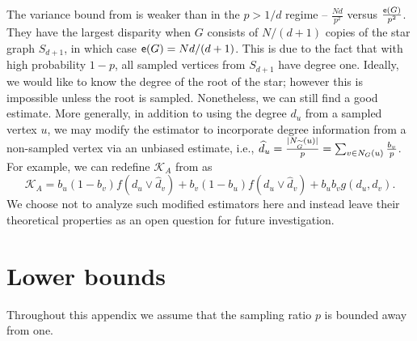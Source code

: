 \begin{remark}
The variance bound from  is weaker than  in the $ p > 1/d $ regime -- $ \frac{Nd}{p^2} $ versus $ \frac{{\mathsf{e}}(G)}{p^2} $. They have the largest disparity when $ G $ consists of $ N/(d+1) $ copies of the star graph $ S_{d+1} $, in which case $ {\mathsf{e}}(G) = Nd/(d+1) $. This is due to the fact that with high probability $ 1-p $, all sampled vertices from $ S_{d+1} $ have degree one. Ideally, we would like to know the degree of the root of the star; however this is impossible unless the root is sampled. Nonetheless, we can still find a good estimate. More generally, in addition to using the degree $ d_u $ from a sampled vertex $ u $, we may modify the estimator to incorporate degree information from a non-sampled vertex via an unbiased estimate, i.e., $ \widehat{d}_u = \frac{|N_{{\widetilde{G}}}(u)|}{p} = \sum_{v\in N_G(u)} \frac{b_v}{p} $. For example, we can redefine $ \mathcal{K}_{A} $ from  as
\begin{equation*}
\mathcal{K}_{A} = b_{u}(1-b_{v})f(d_u \vee \widehat{d}_v) + b_{v}(1-b_{u})f(d_u \vee \widehat{d}_v) + b_{u}b_{v}g(d_{u}, d_{v}).
\end{equation*}
We choose not to analyze such modified estimators here and instead leave their theoretical properties as an open question for future investigation.
\end{remark}


\section{Lower bounds} \label{app:lower}
Throughout this appendix we assume that the sampling ratio $p$ is bounded away from one.

